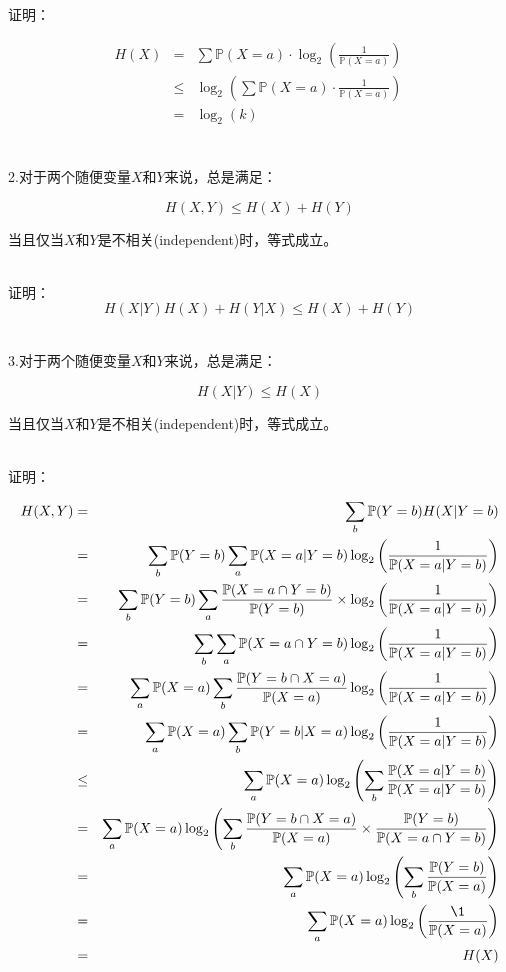 \documentclass{article}
\begin{document}
证明：


\begin{eqnarray}   
\label{eq}
H(X)&=& \sum \mathbb{P}(X=a) \cdot \log_2(\frac{1}{\mathbb{P}(X=a)}) \nonumber \\ 
&\leq& \log_2 (\sum \mathbb{P}(X=a) \cdot \frac{1}{\mathbb{P}(X=a)}) \ \nonumber \\ 
&=& \log_2(k) \nonumber \\ 
\nonumber 
\end{eqnarray}


~\\

2.对于两个随便变量$X$和$Y$来说，总是满足：

$$H(X,Y) \leq H(X) + H(Y)$$

当且仅当$X$和$Y$是不相关(independent)时，等式成立。

~\\

证明：
$$H(X|Y) H(X) + H(Y|X )\leq H(X) + H(Y)$$


~\\

3.对于两个随便变量$X$和$Y$来说，总是满足：

$$H(X|Y) \leq H(X)$$

当且仅当$X$和$Y$是不相关(independent)时，等式成立。

~\\

证明：


\begin{eqnarray}   
\label{eq}
H(X,Y)&=& \sum_b \mathbb{P}(Y=b)H(X|Y=b)\nonumber \\ 
&=&\sum_b \mathbb{P}(Y=b) \sum_a \mathbb{P}(X=a|Y=b) \log_2 \left( \frac{1}{\mathbb{P}(X=a|Y=b)} \right)  \nonumber \\  
&=&  \sum_b \mathbb{P}(Y=b) \sum_a \frac{\mathbb{P}(X=a \cap Y=b)}{\mathbb{P}(Y=b)} \times \log_2 \left( \frac{1}{\mathbb{P}(X=a|Y=b)} \right) \nonumber \\  
&=& \sum_b \sum_a \mathbb{P}(X=a \cap Y=b) \log_2 \left( \frac{1}{\mathbb{P}(X=a|Y=b)} \right)\nonumber \\  
&=& \sum_a \mathbb{P}(X=a) \sum_b \frac{\mathbb{P}(Y=b \cap X=a )}{\mathbb{P}(X=a)}  \log_2 \left( \frac{1}{\mathbb{P}(X=a|Y=b)} \right)\nonumber \\  
&=& \sum_a \mathbb{P}(X=a) \sum_b\mathbb{P}( Y=b|X=a )  \log_2 \left( \frac{1}{\mathbb{P}(X=a|Y=b)} \right)\nonumber \\  
&\leq&  \sum_a \mathbb{P}(X=a) \log_2 \left(  \sum_b \frac{\mathbb{P}(X=a|Y=b)} {\mathbb{P}(X=a|Y=b)} \right)\nonumber \\  
&=&\sum_a \mathbb{P}(X=a) \log_2 \left(  \sum_b \frac{\mathbb{P}(Y=b \cap X=a)} {\mathbb{P}(X=a)} \times \frac{\mathbb{P}(Y=b)} {\mathbb{P}(X=a \cap Y=b)} \right)\nonumber \\
&=& \sum_a \mathbb{P}(X=a) \log_2 \left(  \sum_b \frac{\mathbb{P}(Y=b)} {\mathbb{P}(X=a)} \right)\nonumber \\
&=& \sum_a \mathbb{P}(X=a) \log_2 \left( \frac{\1} {\mathbb{P}(X=a)} \right) \nonumber \\
&=& H(X)\nonumber \\
\nonumber 
\end{eqnarray}
\end{document}
